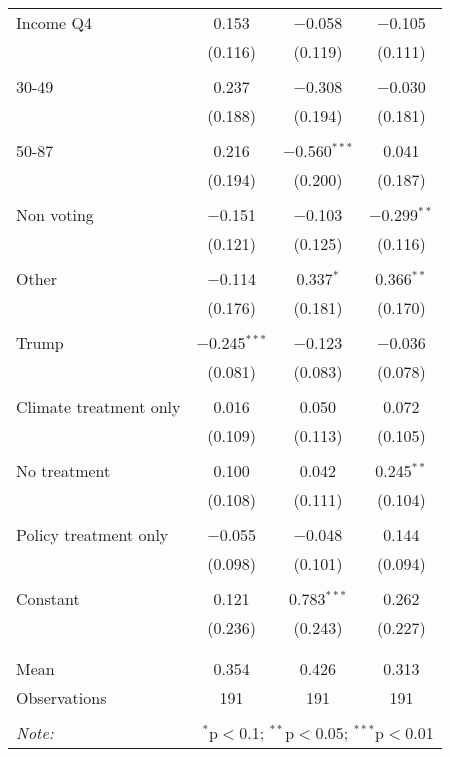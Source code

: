 \begin{tabular}{@{\extracolsep{5pt}}lccc}
 Income Q4 & 0.153 & $-$0.058 & $-$0.105 \\ 
  & (0.116) & (0.119) & (0.111) \\ 
  & & & \\ 
 30-49 & 0.237 & $-$0.308 & $-$0.030 \\ 
  & (0.188) & (0.194) & (0.181) \\ 
  & & & \\ 
 50-87 & 0.216 & $-$0.560$^{***}$ & 0.041 \\ 
  & (0.194) & (0.200) & (0.187) \\ 
  & & & \\ 
 Non voting & $-$0.151 & $-$0.103 & $-$0.299$^{**}$ \\ 
  & (0.121) & (0.125) & (0.116) \\ 
  & & & \\ 
 Other & $-$0.114 & 0.337$^{*}$ & 0.366$^{**}$ \\ 
  & (0.176) & (0.181) & (0.170) \\ 
  & & & \\ 
 Trump & $-$0.245$^{***}$ & $-$0.123 & $-$0.036 \\ 
  & (0.081) & (0.083) & (0.078) \\ 
  & & & \\ 
 Climate treatment only & 0.016 & 0.050 & 0.072 \\ 
  & (0.109) & (0.113) & (0.105) \\ 
  & & & \\ 
 No treatment & 0.100 & 0.042 & 0.245$^{**}$ \\ 
  & (0.108) & (0.111) & (0.104) \\ 
  & & & \\ 
 Policy treatment only & $-$0.055 & $-$0.048 & 0.144 \\ 
  & (0.098) & (0.101) & (0.094) \\ 
  & & & \\ 
 Constant & 0.121 & 0.783$^{***}$ & 0.262 \\ 
  & (0.236) & (0.243) & (0.227) \\ 
  & & & \\ 
\hline \\[-1.8ex] 
Mean & 0.354 & 0.426 & 0.313 \\ 
Observations & 191 & 191 & 191 \\ 
\hline 
\hline \\[-1.8ex] 
\textit{Note:}  & \multicolumn{3}{r}{$^{*}$p$<$0.1; $^{**}$p$<$0.05; $^{***}$p$<$0.01} \\ 
\end{tabular} 
